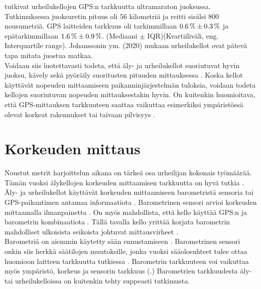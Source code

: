 \documentclass[utf8,bachelor,finnish]{bachelor}
\begin{document}
  \textcite{johansson_accuracy_2020} tutkivat urheilukellojen GPS:n tarkkuutta ultramaraton juoksussa. Tutkimuksessa juoksuretin pituus oli 56 kilometriä ja reitti sisälsi 800 nousumetriä.
    GPS laitteiden tarkkuus oli tarkimmillaan $\SI{0.6 \pm 0.3}{\percent}$ ja epätarkimmillaan $ \SI{1.6 \pm 0.9}{\percent} $. (Mediaani $\pm$ IQR)(Kvartiiliväli, eng. Interquartile range).
     Johanssonin ym. (2020) mukaan urheilukellot ovat pätevä tapa mitata juostua matkaa.\\

  Voidaan siis luotettavasti todeta, että äly- ja urheilukellot suoriutuvat hyvin juoksu, kävely sekä pyöräily suoritusten pituuden mittauksessa \parencite{gilgen-ammann_accuracy_2020,johansson_accuracy_2020}.
   Koska kellot käyttävät nopeuden mittaamiseen paikanninjärjestelmän tuloksia, voidaan todeta kellojen suoriutuvan nopeuden mittauksestakin hyvin. On kuitenkin huomioitava,
    että GPS-mittauksen tarkkuuteen saattaa vaikuttaa esimerkiksi ympäristössä olevat korkeat rakennukset tai taivaan pilvisyys \parencite{baranski_enhancing_2012}.

  \section{Korkeuden mittaus}
    Noustut metrit harjoittelun aikana on tärkeä osa urheilijan kokonais työmäärää. Tämän vuoksi älykellojen korkeuden mittaamisen tarkkuutta on hyvä tutkia \parencite{ammann_accuracy_2016}.
     Äly- ja urheilukellot käyttävät korkeuden mittaamiseen barometristä sensoria tai GPS-paikantimen antamaa informaatiota \parencite{ammann_accuracy_2016}.
      Barometrinen sensori arvioi korkeuden mittaamalla ilmanpainetta \parencite{aroganam2019review}.
       On myös mahdollista, että kello käyttää GPS:n ja barometrin kombinaatiota \parencite{aroganam2019review}. Tällä tavalla kello yrittää korjata barometrin mahdolliset ulkoisista seikoista
        johtuvat mittausvirheet \parencite{aroganam2019review}.\\
        
        Barometriä on aiemmin käytetty sään ennustamiseen \parencite{manivannan_challenges_2020}.
         Barometrinen sensori onkin siis herkkä säätilojen muutoksille, jonka vuoksi sääolosuhteet tulee ottaa huomioon laitteen tarkkuutta tutkiessa \parencite{manivannan_challenges_2020, ammann_accuracy_2016}.
          Barometrin tarkkuuteen voi vaikuttaa myös ympäristö, korkeus ja sensorin tarkkuus (\cite{manivannan_challenges_2020}.)
           Barometrien tarkkuudesta äly- tai urheilukelloissa on kuitenkin tehty suppeasti tutkimusta.\\
           
\end{document}
